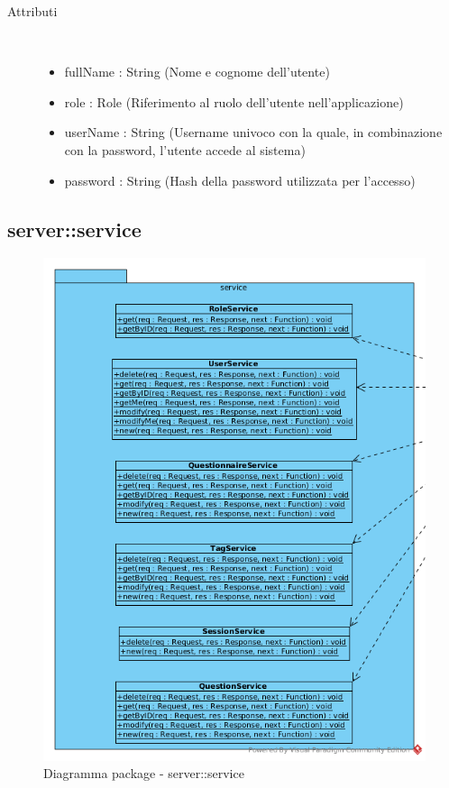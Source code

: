 \begin{description}
\item[Attributi] \hfill \\
 \vspace{-7mm}
\begin{itemize}
\item fullName : String (Nome e cognome dell'utente)
\item role : Role (Riferimento al ruolo dell'utente nell'applicazione)
\item userName : String (Username univoco con la quale, in combinazione con la password, l'utente accede al sistema)
\item password : String (Hash della password utilizzata per l'accesso)
\end{itemize}

\end{description}

\vspace{0.5cm}
\subsection{server::service}
\begin{center}
		\begin{figure}[H]
			\centering \includegraphics[scale=4, max width=\textwidth, max height=\myheight]{../img/diagrammiClassi/server/service.png}
			\caption{Diagramma package - server::service}
		\end{figure}
	\end{center}\hypertarget{server::service::UserService}{}
